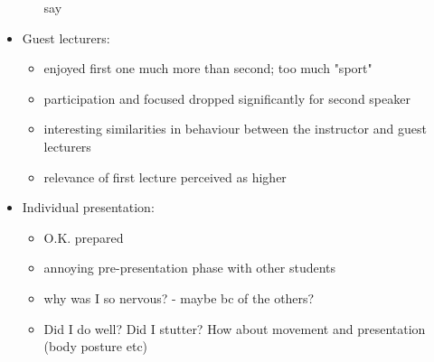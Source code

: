 \documentclass[12pt]{article}
\begin{document}
\begin{itemize}
\begin{itemize}
                say
        \end{itemize}
    \item Guest lecturers:
        \begin{itemize}
            \item enjoyed first one much more than second; too much "sport"
            \item participation and focused dropped significantly for second
                speaker 
            \item interesting similarities in behaviour between the instructor
                and guest lecturers
            \item relevance of first lecture perceived as higher
        \end{itemize}
    \item Individual presentation:
        \begin{itemize}
            \item O.K. prepared
            \item annoying pre-presentation phase with other students
            \item why was I so nervous? - maybe bc of the others?
            \item Did I do well? Did I stutter? How about movement and
                presentation (body posture etc)
        \end{itemize}
\end{itemize}

\pagebreak

{}

\end{document}

